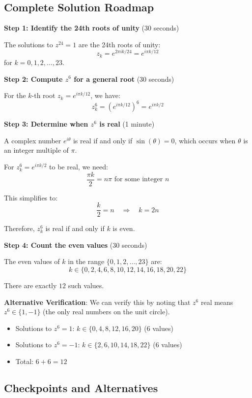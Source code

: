 \documentclass[]{article}
\begin{document}
\begin{solutionbox}
\subsection*{Complete Solution Roadmap}

\textbf{Step 1: Identify the 24th roots of unity} (30 seconds)

The solutions to $z^{24} = 1$ are the 24th roots of unity:
\[z_k = e^{2\pi i k/24} = e^{i\pi k/12}\]
for $k = 0, 1, 2, \ldots, 23$.

\textbf{Step 2: Compute $z^6$ for a general root} (30 seconds)

For the $k$-th root $z_k = e^{i\pi k/12}$, we have:
\[z_k^6 = \left(e^{i\pi k/12}\right)^6 = e^{i\pi k/2}\]

\textbf{Step 3: Determine when $z^6$ is real} (1 minute)

A complex number $e^{i\theta}$ is real if and only if $\sin(\theta) = 0$, which occurs when $\theta$ is an integer multiple of $\pi$.

For $z_k^6 = e^{i\pi k/2}$ to be real, we need:
\[\frac{\pi k}{2} = n\pi \text{ for some integer } n\]

This simplifies to:
\[\frac{k}{2} = n \quad \Rightarrow \quad k = 2n\]

Therefore, $z_k^6$ is real if and only if $k$ is even.

\textbf{Step 4: Count the even values} (30 seconds)

The even values of $k$ in the range $\{0, 1, 2, \ldots, 23\}$ are:
\[k \in \{0, 2, 4, 6, 8, 10, 12, 14, 16, 18, 20, 22\}\]

There are exactly $\boxed{12}$ such values.

\textbf{Alternative Verification}: We can verify this by noting that $z^6$ real means $z^6 \in \{1, -1\}$ (the only real numbers on the unit circle). 
\begin{itemize}
    \item Solutions to $z^6 = 1$: $k \in \{0, 4, 8, 12, 16, 20\}$ (6 values)
    \item Solutions to $z^6 = -1$: $k \in \{2, 6, 10, 14, 18, 22\}$ (6 values)
    \item Total: $6 + 6 = 12$ \checkmark
\end{itemize}

\subsection*{Checkpoints and Alternatives}


\end{solutionbox}
\end{document}
